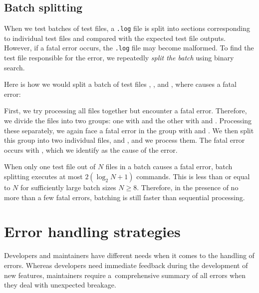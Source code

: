 \documentclass[final]{ltugboat}
\begin{document}
\subsection{Batch splitting}

When we test batches of test files, a \texttt{.log} file is split into sections corresponding to individual test files and compared with the expected test file outputs. However, if a fatal error occurs, the \texttt{.log} file may become malformed. To find the test file responsible for the error, we repeatedly \emph{split the batch} using binary search.

Here is how we would split a batch of test files , , and , where  causes a fatal error:

\medskip
\noindent
\begingroup
\centering

\par
\endgroup

\medskip
\noindent
First, we try processing all files together but encounter a fatal error. Therefore, we divide the files into two groups: one with  and the other with  and . Processing these separately, we again face a fatal error in the group with  and . We then split this group into two individual files,  and , and we process them. The fatal error occurs with , which we identify as the cause of the error.

When only one test file out of $N$ files in a batch causes a fatal error, batch splitting executes at most $2 (\log_2 N + 1)$ commands. This is less than or equal to $N$ for sufficiently large batch sizes $N\geq 8$. Therefore, in the presence of no more than a few fatal errors, batching is still faster than sequential processing.

\smallskip
\noindent
\begingroup

\par
\endgroup

\section{Error handling strategies}
\label{sec:error-handling-strategies}

Developers and maintainers have different needs when it comes to the handling of errors. Whereas developers need immediate feedback during the development of new features, maintainers require a~comprehensive summary of all errors when they deal with unexpected breakage.
\end{document}
